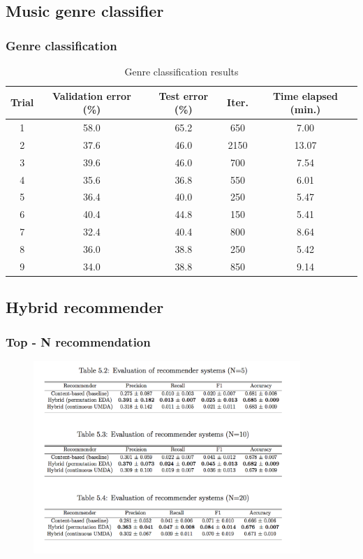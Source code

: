 \documentclass{beamer}
\begin{document}
\subsection{Music genre classifier}
\begin{frame}
	\frametitle{Genre classification}
\begin{table}[h!]
	\caption{Genre classification results} %
	\centering %
	\begin{tabular}{c c c c c} %
		\hline\hline %
		Trial & Validation error (\%) & Test error (\%) & Iter. & Time elapsed (min.) \\ [0.5ex] %
		\hline %
		1 & 58.0 & 65.2 & 650 & 7.00 \\ %
		2 & 37.6 & 46.0 & 2150 & 13.07 \\
		3 & 39.6 & 46.0 & 700 & 7.54 \\
		4 & 35.6 & 36.8 & 550 & 6.01 \\
		5 & 36.4 & 40.0 & 250 & 5.47 \\
		6 & 40.4 & 44.8 & 150 & 5.41 \\
		7 & 32.4 & 40.4 & 800 & 8.64 \\
		8 & 36.0 & 38.8 & 250 & 5.42 \\
		9 & 34.0 & 38.8 & 850 & 9.14 \\ [1ex] %
		\hline %
	\end{tabular}
	\label{table:genre} %
\end{table}
\end{frame}

\subsection{Hybrid recommender}
\begin{frame}
\frametitle{Top - N recommendation}
\begin{figure}[ht!]
	\centering
	\includegraphics[width=0.9\textwidth]{a.png}
\end{figure}
\end{frame}
\end{document}
